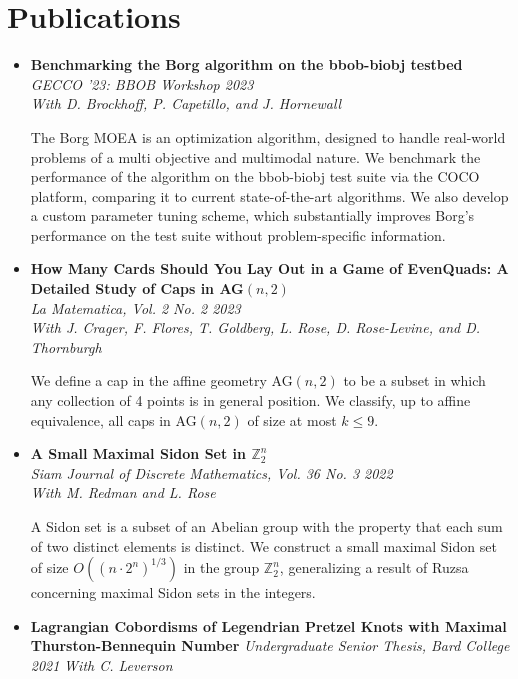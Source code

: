 \documentclass[12pt,letterpaper]{article}
\begin{document}
\section*{Publications}
\begin{itemize}[label=]
    \item
        \textbf{Benchmarking the Borg algorithm on the bbob-biobj testbed}\\
        \textit{GECCO '23: BBOB Workshop \hfill 2023}\\
        \textit{With D. Brockhoff, P. Capetillo, and J. Hornewall}

        The Borg MOEA is an optimization algorithm, designed to handle real-world problems of a multi objective and multimodal nature.
        We benchmark the performance of the algorithm on the bbob-biobj test suite via the COCO platform, comparing it to current state-of-the-art algorithms.
        We also develop a custom parameter tuning scheme, which substantially improves Borg's performance on the test suite without problem-specific information.

    \item
        \textbf{How Many Cards Should You Lay Out in a Game of EvenQuads: A Detailed Study of Caps in AG$(n, 2)$}\\
        \textit{La Matematica, Vol. 2 No. 2 \hfill 2023}\\
        \textit{With J. Crager, F. Flores, T. Goldberg, L. Rose, D. Rose-Levine, and D. Thornburgh}

        We define a cap in the affine geometry AG$(n, 2)$ to be a subset in which any collection of 4 points is in general position.
        We classify, up to affine equivalence, all caps in AG$(n, 2)$ of size at most $k \leq 9$.

    \item
        \textbf{A Small Maximal Sidon Set in $\mathbb{Z}_2^n$}\\
        \textit{Siam Journal of Discrete Mathematics, Vol. 36 No. 3 \hfill 2022}\\
        \textit{With M. Redman and L. Rose}

        A Sidon set is a subset of an Abelian group with the property that each sum of two distinct elements is distinct.
        We construct a small maximal Sidon set of size $O((n \cdot 2^n)^{1/3})$ in the group ${\mathbb{Z}}_2^n$,
        generalizing a result of Ruzsa concerning maximal Sidon sets in the integers.

    \item
        \textbf{Lagrangian Cobordisms of Legendrian Pretzel Knots with Maximal Thurston-Bennequin Number}
        \textit{Undergraduate Senior Thesis, Bard College \hfill 2021}
        \textit{With C. Leverson}


\end{itemize}
\end{document}

